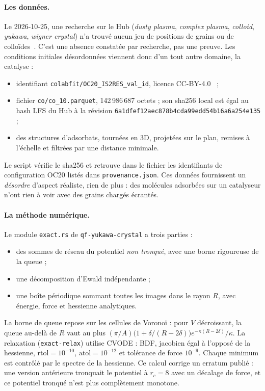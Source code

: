 \paragraph{Les données.} Le 2026-10-25, une recherche sur le Hub (\emph{dusty plasma}, \emph{complex plasma},
\emph{colloid}, \emph{yukawa}, \emph{wigner crystal}) n'a trouvé aucun jeu de positions de grains ou de
colloïdes~\cite{ch2yuk}. C'est une absence constatée par recherche, pas une preuve. Les conditions initiales
désordonnées viennent donc d'un tout autre domaine, la catalyse :
\begin{itemize}
\item identifiant \texttt{colabfit/OC20\_IS2RES\_val\_id}, licence CC-BY-4.0~\cite{ch5:oc20} ;
\item fichier \texttt{co/co\_10.parquet}, 142\,986\,687 octets ; son sha256 local est égal au hash LFS du Hub à la
révision \texttt{6a1dfef12aec878b4cda99edd54b16a6a254e135} ;
\item des structures d'adsorbats, tournées en 3D, projetées sur le plan, remises à l'échelle et filtrées par une
distance minimale.
\end{itemize}
Le script vérifie le sha256 et retrouve dans le fichier les identifiants de configuration OC20 listés dans
\texttt{provenance.json}. Ces données fournissent un \emph{désordre} d'aspect réaliste, rien de plus : des molécules
adsorbées sur un catalyseur n'ont rien à voir avec des grains chargés écrantés.

\paragraph{La méthode numérique.} Le module \texttt{exact.rs} de \texttt{qf-yukawa-crystal} a trois parties :
\begin{itemize}
\item des sommes de réseau du potentiel \emph{non tronqué}, avec une borne rigoureuse de la queue ;
\item une décomposition d'Ewald indépendante ;
\item une boîte périodique sommant toutes les images dans le rayon $R$, avec énergie, force et hessienne
analytiques.
\end{itemize}
La borne de queue repose sur les cellules de Voronoï : pour $V$ décroissant, la queue au-delà de $R$ vaut au plus
$(\pi/A)\bigl(1+\delta/(R-2\delta)\bigr)e^{-\kappa(R-2\delta)}/\kappa$. La relaxation (\texttt{exact-relax}) utilise
CVODE : BDF, jacobien égal à l'opposé de la hessienne, $\mathrm{rtol}=10^{-10}$, $\mathrm{atol}=10^{-12}$ et
tolérance de force $10^{-9}$. Chaque minimum est contrôlé par le spectre de la hessienne. Ce calcul corrige un
erratum publié : une version antérieure tronquait le potentiel à $r_c=8$ avec un décalage de force, et ce potentiel
tronqué n'est plus complètement monotone.

